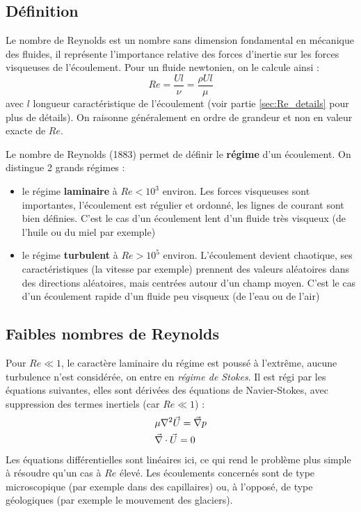 
\subsection{Définition}
Le nombre de Reynolds est un nombre sans dimension fondamental en mécanique des fluides, il représente l'importance relative des forces d'inertie sur les forces visqueuses de l'écoulement. Pour un fluide newtonien, on le calcule ainsi :
%
\begin{equation}
    Re = \frac{Ul}{\nu}
       = \frac{\rho U l}{\mu}
\end{equation}
%
avec $l$ longueur caractéristique de l'écoulement (voir partie \ref{sec:Re_details} pour plus de détails). On raisonne généralement en ordre de grandeur et non en valeur exacte de $Re$.

Le nombre de Reynolds (1883) permet de définir le \textbf{régime} d'un écoulement. On distingue 2 grands régimes :
%
\begin{itemize}
    \item le régime \textbf{laminaire} à $Re<10^3$ environ. Les forces visqueuses sont importantes, l'écoulement est régulier et ordonné, les lignes de courant sont bien définies. C'est le cas d'un écoulement lent d'un fluide très visqueux (de l'huile ou du miel par exemple)
    \item le régime \textbf{turbulent} à $Re>10^5$ environ. L'écoulement devient chaotique, ses caractéristiques (la vitesse par exemple) prennent des valeurs aléatoires dans des directions aléatoires, mais centrées autour d'un champ moyen. C'est le cas d'un écoulement rapide d'un fluide peu visqueux (de l'eau ou de l'air)
\end{itemize}


\subsection{Faibles nombres de Reynolds}
Pour $Re \ll 1$, le caractère laminaire du régime est poussé à l'extrême, aucune turbulence n'est considérée, on entre en \textit{régime de Stokes}. Il est régi par les équations suivantes, elles sont dérivées des équations de Navier-Stokes, avec suppression des termes inertiels (car $Re \ll 1$) :
%
\begin{align}[left=\empheqlbrace]
    & \mu \nabla^2 \vec{U} = \vec{\nabla} p\\
    \notag & \vec{\nabla} \cdot \vec{U} = 0
\end{align}
%
Les équations différentielles sont linéaires ici, ce qui rend le problème plus simple à résoudre qu'un cas à $Re$ élevé. Les écoulements concernés sont de type microscopique (par exemple dans des capillaires) ou, à l'opposé, de type géologiques (par exemple le mouvement des glaciers).


